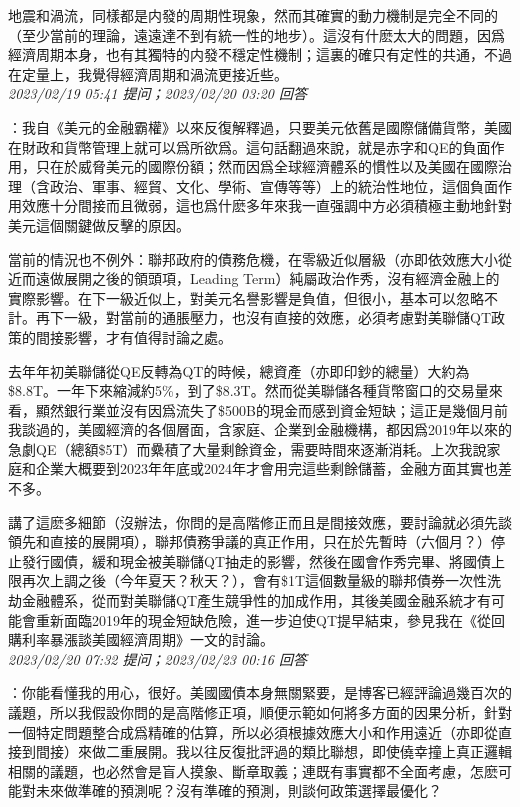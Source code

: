 \documentclass[twocolumn]{ctexart}
\begin{document}
地震和渦流，同樣都是内發的周期性現象，然而其確實的動力機制是完全不同的（至少當前的理論，遠遠達不到有統一性的地步）。這沒有什麽太大的問題，因爲經濟周期本身，也有其獨特的内發不穩定性機制；這裏的確只有定性的共通，不過在定量上，我覺得經濟周期和渦流更接近些。
\\

\textit{\hfill\noindent\small 2023/02/19 05:41 提问；2023/02/20 03:20 回答}

：我自《美元的金融霸權》以來反復解釋過，只要美元依舊是國際儲備貨幣，美國在財政和貨幣管理上就可以爲所欲爲。這句話翻過來說，就是赤字和QE的負面作用，只在於威脅美元的國際份額；然而因爲全球經濟體系的慣性以及美國在國際治理（含政治、軍事、經貿、文化、學術、宣傳等等）上的統治性地位，這個負面作用效應十分間接而且微弱，這也爲什麽多年來我一直强調中方必須積極主動地針對美元這個關鍵做反擊的原因。

當前的情況也不例外：聯邦政府的債務危機，在零級近似層級（亦即依效應大小從近而遠做展開之後的領頭項，Leading Term）純屬政治作秀，沒有經濟金融上的實際影響。在下一級近似上，對美元名譽影響是負值，但很小，基本可以忽略不計。再下一級，對當前的通脹壓力，也沒有直接的效應，必須考慮對美聯儲QT政策的間接影響，才有值得討論之處。

去年年初美聯儲從QE反轉為QT的時候，總資產（亦即印鈔的總量）大約為\$8.8T。一年下來縮減約5\%，到了\$8.3T。然而從美聯儲各種貨幣窗口的交易量來看，顯然銀行業並沒有因爲流失了\$500B的現金而感到資金短缺；這正是幾個月前我談過的，美國經濟的各個層面，含家庭、企業到金融機構，都因爲2019年以來的急劇QE（總額\$5T）而纍積了大量剩餘資金，需要時間來逐漸消耗。上次我說家庭和企業大概要到2023年年底或2024年才會用完這些剩餘儲蓄，金融方面其實也差不多。

講了這麽多細節（沒辦法，你問的是高階修正而且是間接效應，要討論就必須先談領先和直接的展開項），聯邦債務爭議的真正作用，只在於先暫時（六個月？）停止發行國債，緩和現金被美聯儲QT抽走的影響，然後在國會作秀完畢、將國債上限再次上調之後（今年夏天？秋天？），會有\$1T這個數量級的聯邦債券一次性洗劫金融體系，從而對美聯儲QT產生競爭性的加成作用，其後美國金融系統才有可能會重新面臨2019年的現金短缺危險，進一步迫使QT提早結束，參見我在《從回購利率暴漲談美國經濟周期》一文的討論。
\\

\textit{\hfill\noindent\small 2023/02/20 07:32 提问；2023/02/23 00:16 回答}

：你能看懂我的用心，很好。美國國債本身無關緊要，是博客已經評論過幾百次的議題，所以我假設你問的是高階修正項，順便示範如何將多方面的因果分析，針對一個特定問題整合成爲精確的估算，所以必須根據效應大小和作用遠近（亦即從直接到間接）來做二重展開。我以往反復批評過的類比聯想，即使僥幸撞上真正邏輯相關的議題，也必然會是盲人摸象、斷章取義；連既有事實都不全面考慮，怎麽可能對未來做準確的預測呢？沒有準確的預測，則談何政策選擇最優化？
\end{document}
